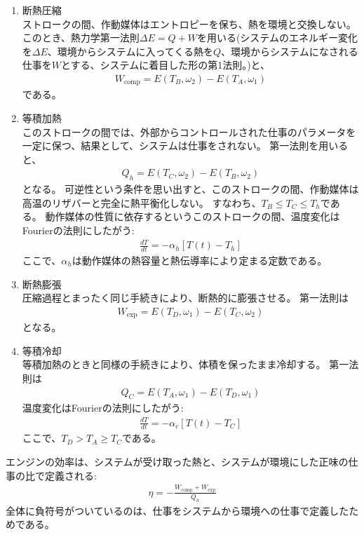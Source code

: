 \documentclass[a4paper,11pt]{jsarticle}
\numberwithin{equation}{section}
\begin{document}
\begin{enumerate}
  \item 断熱圧縮\\
  ストロークの間、作動媒体はエントロピーを保ち、熱を環境と交換しない。このとき、熱力学第一法則$\Delta E=Q+W$を用いる(システムのエネルギー変化を$\Delta E$、環境からシステムに入ってくる熱を$Q$、環境からシステムになされる仕事を$W$とする、システムに着目した形の第1法則。)と、
  \begin{align}
    W_{\text{comp}}=E(T_B,\omega_2)-E(T_A,\omega_1)
  \end{align}
  である。\\
  \item 等積加熱\\
  このストロークの間では、外部からコントロールされた仕事のパラメータを一定に保つ、結果として、システムは仕事をされない。
  第一法則を用いると、
  \begin{align}
  Q_h=E(T_C,\omega_2)-E(T_B,\omega_2)
  \end{align}
  となる。
  可逆性という条件を思い出すと、このストロークの間、作動媒体は高温のリザバーと完全に熱平衡化しない。
  すなわち、$T_B\leq T_C \leq T_h$である。
  動作媒体の性質に依存するというこのストロークの間、温度変化はFourierの法則にしたがう:
  \begin{align}
    \frac{dT}{dt}=-\alpha_h \left[T(t)-T_h\right]
  \end{align}
  ここで、$\alpha_h$は動作媒体の熱容量と熱伝導率により定まる定数である。\\
  \item 断熱膨張\\
  圧縮過程とまったく同じ手続きにより、断熱的に膨張させる。
  第一法則は
  \begin{align}
    W_{\text{exp}}=E(T_D,\omega_1)-E(T_C,\omega_2)
  \end{align}
  となる。\\
  \item 等積冷却\\
  等積加熱のときと同様の手続きにより、体積を保ったまま冷却する。
  第一法則は
  \begin{align}
  Q_C=E(T_A,\omega_1)-E(T_D,\omega_1)
  \end{align}
  温度変化はFourierの法則にしたがう:
  \begin{align}
    \frac{dT}{dt}=-\alpha_c \left[T(t)-T_C\right] 
  \end{align}
  ここで、$T_D > T_A \geq T_C$である。
\end{enumerate}

エンジンの効率は、システムが受け取った熱と、システムが環境にした正味の仕事の比で定義される:
\begin{align}
\eta=-\frac{W_{\text{comp}}+W_{\text{exp}}}{Q_h}
\end{align}
全体に負符号がついているのは、仕事をシステムから環境への仕事で定義したためである。
\end{document}
